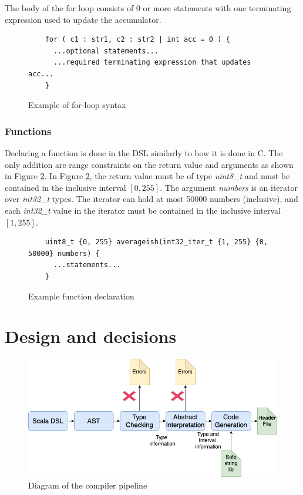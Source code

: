 \documentclass[letterpaper]{article}
\begin{document}
The body of the for loop consists of 0 or more statements with one terminating
expression used to update the accumulator.

\begin{figure}[h]
\centering
\begin{lstlisting}
    for ( c1 : str1, c2 : str2 | int acc = 0 ) {
      ...optional statements...
      ...required terminating expression that updates acc...
    }
\end{lstlisting}
\caption{Example of for-loop syntax}
\label{fig:forloopsyntax}
\end{figure}

\subsubsection{Functions}

Declaring a function is done in the DSL similarly to how it is done in C.
The only addition are range constraints on the return value and arguments
as shown in Figure \ref{fig:functionsyntax}. In Figure \ref{fig:functionsyntax},
the return value must be of type \textit{uint8\_t} and must be contained in
the inclusive interval $[0, 255]$. The argument \textit{numbers} is an iterator
over \textit{int32\_t} types. The iterator can hold at most 50000 numbers (inclusive),
and each \textit{int32\_t} value in the iterator must be contained in the
inclusive interval $[1, 255]$.

\begin{figure}[h]
\centering
\begin{lstlisting}
    uint8_t {0, 255} averageish(int32_iter_t {1, 255} {0, 50000} numbers) {
      ...statements...
    }
\end{lstlisting}
\caption{Example function declaration}
\label{fig:functionsyntax}
\end{figure}

\section{Design and decisions}

\begin{figure}[h]
  \centering
  \includegraphics[width=\textwidth]{architecture.png}
  \caption{Diagram of the compiler pipeline}
  \label{fig:pipeline}
\end{figure}
\end{document}
